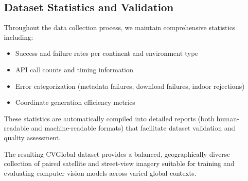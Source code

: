 \subsection{Dataset Statistics and Validation}

Throughout the data collection process, we maintain comprehensive statistics including:
\begin{itemize}
    \item Success and failure rates per continent and environment type
    \item API call counts and timing information
    \item Error categorization (metadata failures, download failures, indoor rejections)
    \item Coordinate generation efficiency metrics
\end{itemize}

These statistics are automatically compiled into detailed reports (both human-readable and machine-readable formats) that facilitate dataset validation and quality assessment.

The resulting CVGlobal dataset provides a balanced, geographically diverse collection of paired satellite and street-view imagery suitable for training and evaluating computer vision models across varied global contexts.